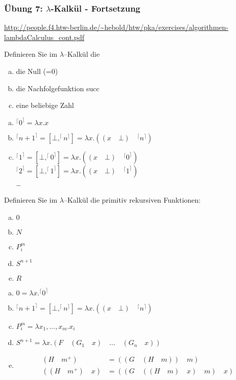 \begin{card}
	\frametitle{Übung 7: $\lambda$-Kalkül - Fortsetzung}
	\url{http://people.f4.htw-berlin.de/~hebold/htw/pka/exercises/algorithmen-lambdaCalculus_cont.pdf}
\end{card}

\begin{card}
	Definieren Sie im $\lambda$–Kalkül die
	\begin{enumerate}[a)]
    \item die Null (=0)
    \item die Nachfolgefunktion succ
    \item eine beliebige Zahl
	\end{enumerate}
	\hr
	\begin{enumerate}[a)]
    \item $^\lceil 0 ^\rceil = \lambda x.x$
    \item $^\lceil n+1 ^\rceil = [\bot, ^\lceil n ^\rceil] = \lambda x.((x \quad \bot) \quad ^\lceil n ^\rceil)$
    \item $^\lceil 1 ^\rceil = [\bot, ^\lceil 0 ^\rceil] = \lambda x.((x \quad \bot) \quad ^\lceil 0 ^\rceil)$\\
        $^\lceil 2 ^\rceil = [\bot, ^\lceil 1 ^\rceil] = \lambda x.((x \quad \bot) \quad ^\lceil 1 ^\rceil)$\\
        \dots
	\end{enumerate}
\end{card}

\begin{card}
	Definieren Sie im $\lambda$–Kalkül die primitiv rekursiven Funktionen:
	\begin{enumerate}[a)]
    \item $0$
    \item $N$
    \item $P^m_i$
    \item $S^{n+1}$
    \item $R$
	\end{enumerate}
	\hr
	\begin{enumerate}[a)]
    \item $0 = \lambda x.^\lceil 0 ^\rceil$
    \item $^\lceil n+1 ^\rceil = [\bot, ^\lceil n ^\rceil] = \lambda x.((x \quad \bot) \quad ^\lceil n ^\rceil)$\\
    \item $P^m_i = \lambda x_1,...,x_m.x_i$
    \item $S^{n+1} = \lambda x.(F \quad (G_1 \quad x) \quad \ldots \quad (G_n \quad x))$
    \item
      \begin{align*}
        (H \quad m^+) &= ((G \quad (H \quad m)) \quad m) \\
        ((H \quad m^+) \quad x) &= ((G \quad ((H \quad m) \quad x) \quad m) \quad x)
      \end{align*}
	\end{enumerate}
\end{card}

